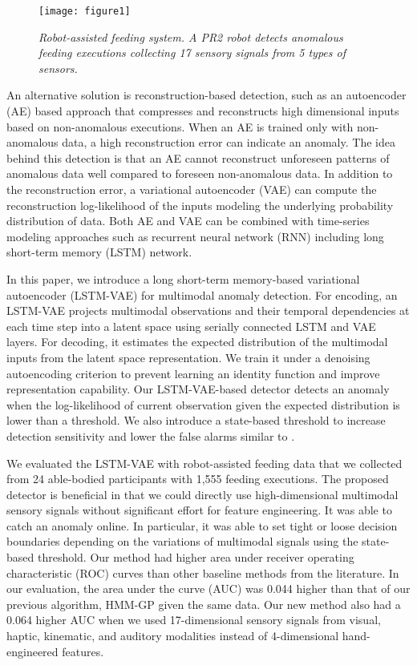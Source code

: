 \documentclass[letterpaper, 10 pt, conference]{ieeeconf}
\begin{document}
\begin{figure}[t]
	\centering
    \texttt{[image: figure1]}
	\caption{\textit{Robot-assisted feeding system. A PR2 robot detects anomalous feeding executions collecting 17 sensory signals from 5 types of sensors.}} 
    \vspace{-1.5em}
	\label{fig: sequence}
\end{figure}


An alternative solution is reconstruction-based detection, such as an autoencoder (AE) based approach that compresses and reconstructs high dimensional inputs based on non-anomalous executions. When an AE is trained only with non-anomalous data, a high reconstruction error can indicate an anomaly. The idea behind this detection is that an AE cannot reconstruct unforeseen patterns of anomalous data well compared to foreseen non-anomalous data. In addition to the reconstruction error, a variational autoencoder (VAE) can compute the reconstruction log-likelihood of the inputs modeling the underlying probability distribution of data. Both AE and VAE can be combined with time-series modeling approaches such as recurrent neural network (RNN) including long short-term memory (LSTM) network.

In this paper, we introduce a long short-term memory-based variational autoencoder (LSTM-VAE) for multimodal anomaly detection. For encoding, an LSTM-VAE projects multimodal observations and their temporal dependencies at each time step into a latent space using serially connected LSTM and VAE layers. For decoding, it estimates the expected distribution of the multimodal inputs from the latent space representation. We train it under a denoising autoencoding criterion \cite{vincent2008extracting} to prevent learning an identity function and improve representation capability. Our LSTM-VAE-based detector detects an anomaly when the log-likelihood of current observation given the expected distribution is lower than a threshold. We also introduce a state-based threshold to increase detection sensitivity and lower the false alarms similar to \cite{park2016multimodal}. 


We evaluated the LSTM-VAE with robot-assisted feeding data that we collected from 24 able-bodied participants with 1,555 feeding executions. The proposed detector is beneficial in that we could directly use high-dimensional multimodal sensory signals without significant effort for feature engineering. It was able to catch an anomaly online. In particular, it was able to set tight or loose decision boundaries depending on the variations of multimodal signals using the state-based threshold. Our method had higher area under receiver operating characteristic (ROC) curves than other baseline methods from the literature. In our evaluation, the area under the curve (AUC) was 0.044 higher than that of our previous algorithm, HMM-GP given the same data. Our new method also had a 0.064 higher AUC when we used 17-dimensional sensory signals from visual, haptic, kinematic, and auditory modalities instead of 4-dimensional hand-engineered features.
\end{document}
